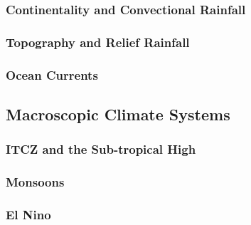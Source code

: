 \documentclass[../main]{subfiles}
\begin{document}
	\subsubsection{Continentality and Convectional Rainfall}

	\subsubsection{Topography and Relief Rainfall}

	\subsubsection{Ocean Currents}

	\subsection{Macroscopic Climate Systems}

	\subsubsection{ITCZ and the Sub-tropical High}

	\subsubsection{Monsoons}

	\subsubsection{El Nino}
\end{document}
